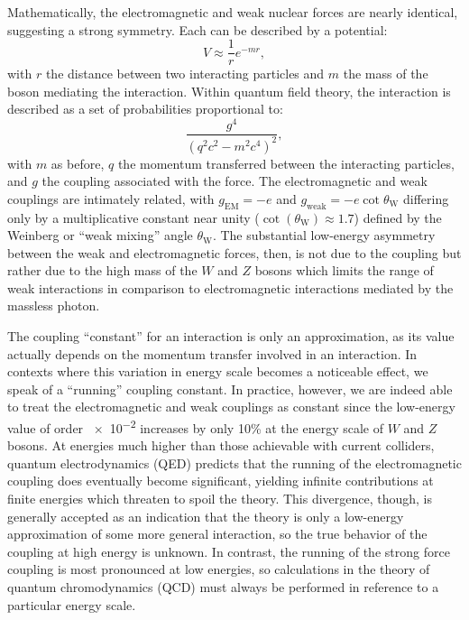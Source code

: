 Mathematically, the electromagnetic and weak nuclear forces are nearly identical, suggesting a strong symmetry.  Each can be described by a potential:
\begin{equation}
  V \approx \frac{1}{r}e^{-mr},
\end{equation}
with $r$ the distance between two interacting particles and $m$ the mass of the boson mediating the interaction.  Within quantum field theory, the interaction is described as a set of probabilities proportional to:
\begin{equation}
  \frac{g^4}{(q^2c^2 - m^2c^4)^2},
\end{equation}
with $m$ as before, $q$ the momentum transferred between the interacting particles, and $g$ the coupling associated with the force.  The electromagnetic and weak couplings are intimately related, with $g_\text{EM} = -e$ and $g_\text{weak} = -e \cot{\theta_\text{W}}$ differing only by a multiplicative constant near unity ($\cot(\theta_\text{W}) \approx 1.7$) defined by the Weinberg or ``weak mixing'' angle $\theta_\text{W}$.  The substantial low-energy asymmetry between the weak and electromagnetic forces, then, is not due to the coupling but rather due to the high mass of the $W$ and $Z$ bosons which limits the range of weak interactions in comparison to electromagnetic interactions mediated by the massless photon.

The coupling ``constant'' for an interaction is only an approximation, as its value actually depends on the momentum transfer involved in an interaction.  In contexts where this variation in energy scale becomes a noticeable effect, we speak of a ``running'' coupling constant.  In practice, however, we are indeed able to treat the electromagnetic and weak couplings as constant since the low-energy value of order \num{e-2} increases by only 10\% at the energy scale of $W$ and $Z$ bosons.  At energies much higher than those achievable with current colliders, quantum electrodynamics (QED) predicts that the running of the electromagnetic coupling does eventually become significant, yielding infinite contributions at finite energies which threaten to spoil the theory.  This divergence, though, is generally accepted as an indication that the theory is only a low-energy approximation of some more general interaction, so the true behavior of the coupling at high energy is unknown.  In contrast, the running of the strong force coupling is most pronounced at low energies, so calculations in the theory of quantum chromodynamics (QCD) must always be performed in reference to a particular energy scale.

